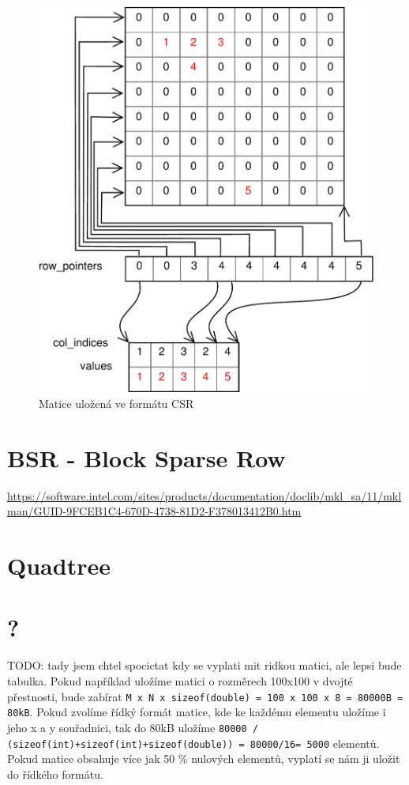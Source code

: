 \begin{figure}[H]\centering
	\includegraphics[width=\textwidth]{./images/csr/csr}
	\caption{Matice uložená ve formátu CSR}
	\label{fig:CSR}
\end{figure}

\section{BSR - Block Sparse Row}

\url{https://software.intel.com/sites/products/documentation/doclib/mkl_sa/11/mklman/GUID-9FCEB1C4-670D-4738-81D2-F378013412B0.htm}



\section{Quadtree}

\section{?}

TODO: tady jsem chtel spocictat kdy  se vyplati mit ridkou matici, ale lepsi bude tabulka. Pokud například uložíme matici o rozměrech 100x100 v dvojté přestnosti, bude zabírat \texttt{M x N x sizeof(double) = 100 x 100 x 8 = 80000B = 80kB}. Pokud zvolíme řídký formát matice, kde ke každému elementu uložíme i jeho x a y souřadnici, tak do 80kB uložíme \texttt{80000 / (sizeof(int)+sizeof(int)+sizeof(double)) = 80000/16= 5000} elementů. Pokud matice obsahuje více jak 50  \% nulových elementů, vyplatí se nám ji uložit do řídkého formátu.


